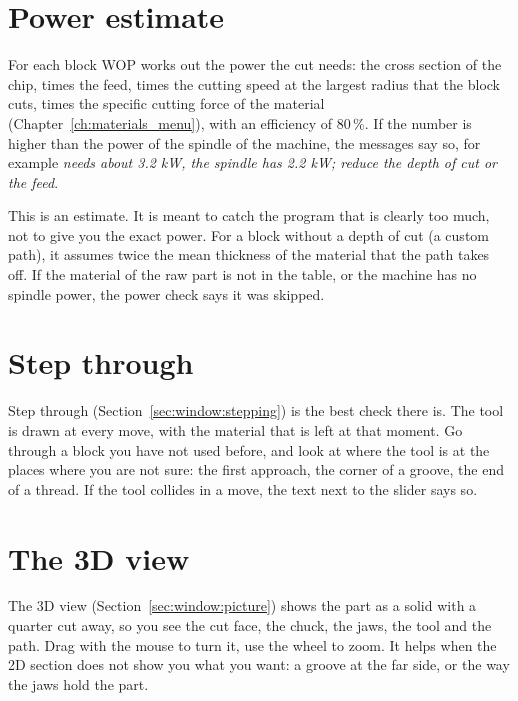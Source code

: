 \section{Power estimate}\label{sec:checking:power}
For each block WOP works out the power the cut needs: the cross section of the chip, times the feed, times the cutting speed at the largest radius that the block cuts, times the specific cutting force of the material (Chapter~\ref{ch:materials_menu}), with an efficiency of 80\,\%. If the number is higher than the power of the spindle of the machine, the messages say so, for example \emph{needs about 3.2 kW, the spindle has 2.2 kW; reduce the depth of cut or the feed}.

This is an estimate. It is meant to catch the program that is clearly too much, not to give you the exact power. For a block without a depth of cut (a custom path), it assumes twice the mean thickness of the material that the path takes off. If the material of the raw part is not in the table, or the machine has no spindle power, the power check says it was skipped.

\section{Step through}\label{sec:checking:step}
Step through (Section~\ref{sec:window:stepping}) is the best check there is. The tool is drawn at every move, with the material that is left at that moment. Go through a block you have not used before, and look at where the tool is at the places where you are not sure: the first approach, the corner of a groove, the end of a thread. If the tool collides in a move, the text next to the slider says so.

\section{The 3D view}\label{sec:checking:3d}
The 3D view (Section~\ref{sec:window:picture}) shows the part as a solid with a quarter cut away, so you see the cut face, the chuck, the jaws, the tool and the path. Drag with the mouse to turn it, use the wheel to zoom. It helps when the 2D section does not show you what you want: a groove at the far side, or the way the jaws hold the part.

